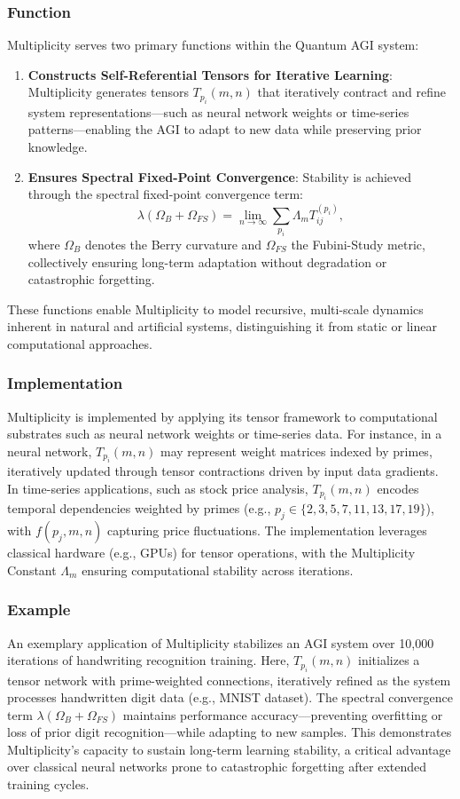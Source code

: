 \documentclass[12pt]{article}
\begin{document}
\subsubsection{Function}
Multiplicity serves two primary functions within the Quantum AGI system:
\begin{enumerate}
    \item \textbf{Constructs Self-Referential Tensors for Iterative Learning}: Multiplicity generates tensors \( T_{p_i}(m, n) \) that iteratively contract and refine system representations—such as neural network weights or time-series patterns—enabling the AGI to adapt to new data while preserving prior knowledge.
    \item \textbf{Ensures Spectral Fixed-Point Convergence}: Stability is achieved through the spectral fixed-point convergence term:
    \[
    \lambda (\Omega_B + \Omega_{FS}) = \lim_{n \to \infty} \sum_{p_i} \Lambda_m T_{ij}^{(p_i)},
    \]
    where \( \Omega_B \) denotes the Berry curvature and \( \Omega_{FS} \) the Fubini-Study metric, collectively ensuring long-term adaptation without degradation or catastrophic forgetting.
\end{enumerate}
These functions enable Multiplicity to model recursive, multi-scale dynamics inherent in natural and artificial systems, distinguishing it from static or linear computational approaches.

\subsubsection{Implementation}
Multiplicity is implemented by applying its tensor framework to computational substrates such as neural network weights or time-series data. For instance, in a neural network, \( T_{p_i}(m, n) \) may represent weight matrices indexed by primes, iteratively updated through tensor contractions driven by input data gradients. In time-series applications, such as stock price analysis, \( T_{p_i}(m, n) \) encodes temporal dependencies weighted by primes (e.g., \( p_j \in \{2, 3, 5, 7, 11, 13, 17, 19\} \)), with \( f(p_j, m, n) \) capturing price fluctuations. The implementation leverages classical hardware (e.g., GPUs) for tensor operations, with the Multiplicity Constant \( \Lambda_m \) ensuring computational stability across iterations.

\subsubsection{Example}
An exemplary application of Multiplicity stabilizes an AGI system over 10,000 iterations of handwriting recognition training. Here, \( T_{p_i}(m, n) \) initializes a tensor network with prime-weighted connections, iteratively refined as the system processes handwritten digit data (e.g., MNIST dataset). The spectral convergence term \( \lambda (\Omega_B + \Omega_{FS}) \) maintains performance accuracy—preventing overfitting or loss of prior digit recognition—while adapting to new samples. This demonstrates Multiplicity’s capacity to sustain long-term learning stability, a critical advantage over classical neural networks prone to catastrophic forgetting after extended training cycles.
\end{document}

